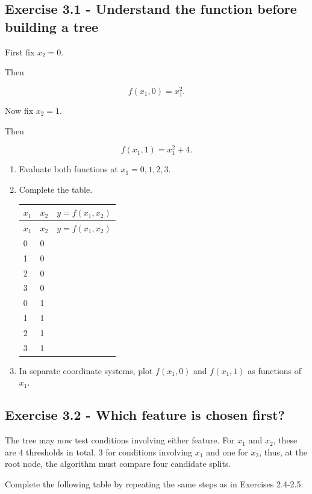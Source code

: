 \documentclass{course_sheet}
\begin{document}
\subsection*{Exercise 3.1 - Understand the function before building a tree}
First fix $x_2=0$.

Then

\[
f(x_1,0)=x_1^2.
\]

Now fix $x_2=1$.

Then

\[
f(x_1,1)=x_1^2+4.
\]

\begin{enumerate}
\item
Evaluate both functions at $x_1=0,1,2,3$.

\item
Complete the table.

\begingroup
\small
\setlength{\tabcolsep}{4pt}
\begin{longtable}{l|l|l}
$x_1$ & $x_2$ & $y=f(x_1,x_2)$ \\
\hline
\endfirsthead
$x_1$ & $x_2$ & $y=f(x_1,x_2)$ \\
\hline
\endhead
0 & 0 &  \\[3pt]
1 & 0 &  \\[3pt]
2 & 0 &  \\[3pt]
3 & 0 &  \\[3pt]
0 & 1 &  \\[3pt]
1 & 1 &  \\[3pt]
2 & 1 &  \\[3pt]
3 & 1 &  \\[3pt]
\end{longtable}
\endgroup
\item
In separate coordinate systems, plot $f(x_1,0)$ and $f(x_1,1)$ as functions of $x_1$.

\end{enumerate}
\subsection*{Exercise 3.2 - Which feature is chosen first?}
The tree may now test conditions involving either feature. For $x_1$ and $x_2$, these are 4 thresholds in total, 3 for conditions involving $x_1$ and one for $x_2$, thus, at the root node, the algorithm must compare four candidate splits.

Complete the following table by repeating the same steps as in Exercises 2.4-2.5:
\end{document}
